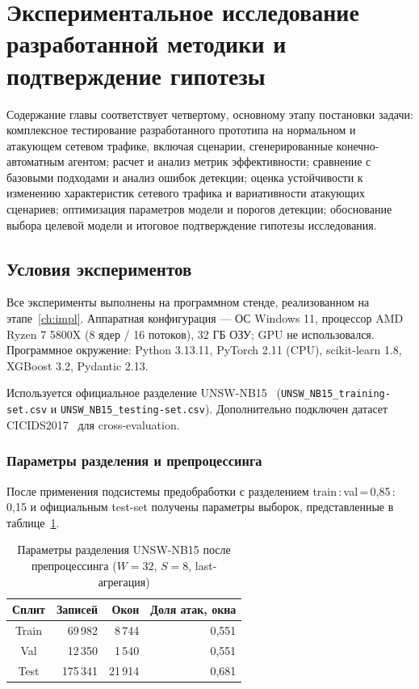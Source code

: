 \section{Экспериментальное исследование разработанной методики и подтверждение гипотезы}
\label{ch:experiments}

\noindent
Содержание главы соответствует четвертому, основному этапу
постановки задачи: комплексное тестирование разработанного
прототипа на нормальном и атакующем сетевом трафике, включая
сценарии, сгенерированные конечно-автоматным агентом; расчет и
анализ метрик эффективности; сравнение с базовыми подходами и
анализ ошибок детекции; оценка устойчивости к изменению
характеристик сетевого трафика и вариативности атакующих
сценариев; оптимизация параметров модели и порогов детекции;
обоснование выбора целевой модели и итоговое подтверждение
гипотезы исследования.

\subsection{Условия экспериментов}

Все эксперименты выполнены на программном стенде, реализованном на
этапе~\ref{ch:impl}. Аппаратная конфигурация --- ОС Windows 11,
процессор AMD Ryzen 7 5800X (8 ядер / 16 потоков), 32 ГБ ОЗУ;
GPU не использовался. Программное окружение: Python 3.13.11,
PyTorch 2.11 (CPU), scikit-learn 1.8, XGBoost 3.2, Pydantic 2.13.

Используется официальное разделение
UNSW-NB15~\cite{moustafa2015unsw}
(\texttt{UNSW\_NB15\_training-set.csv} и
\texttt{UNSW\_NB15\_testing-set.csv}). Дополнительно подключен
датасет CICIDS2017~\cite{sharafaldin2018toward} для cross-evaluation.

\subsubsection{Параметры разделения и препроцессинга}

После применения подсистемы предобработки с разделением
train\,:\,val\,=\,0,85\,:\,0,15 и официальным test-set получены
параметры выборок, представленные в таблице~\ref{tab:dataset-stats}.

\begin{table}[H]
\caption{Параметры разделения UNSW-NB15 после препроцессинга
($W = 32$, $S = 8$, last-агрегация)}
\label{tab:dataset-stats}
\centering
\begin{tabular}{|c|r|r|r|}
\hline
Сплит & Записей & Окон & Доля атак, окна \\
\hline
Train & 69\,982   & 8\,744   & 0{,}551 \\
\hline
Val   & 12\,350   & 1\,540   & 0{,}551 \\
\hline
Test  & 175\,341  & 21\,914  & 0{,}681 \\
\hline
\end{tabular}
\end{table}

